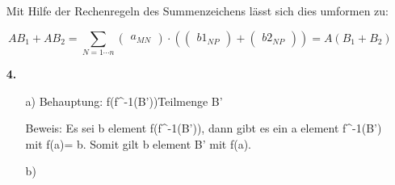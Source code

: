 \documentclass[a4paper,10pt]{scrartcl}
\begin{document}
\begin{enumerate}
        Mit Hilfe der Rechenregeln des Summenzeichens lässt sich dies umformen zu:

        $$
            AB_1 + AB_2 =
            \sum_{N = 1 \cdots n}
            \begin{pmatrix}a_{MN}\end{pmatrix} \cdot \left(
            \begin{pmatrix}b1_{NP}\end{pmatrix} +
            \begin{pmatrix}b2_{NP}\end{pmatrix} \right)
            = A(B_1 + B_2)
        $$

    \item[\textbf{4.}]
        \begin{enumerate}
            \item[a)]
                Behauptung: f(f^-1(B'))Teilmenge B'

        Beweis: Es sei b element f(f^-1(B')), dann gibt es ein a element f^-1(B') mit f(a)= b. Somit gilt b element B' mit f(a).

            \item[b)]

        \end{enumerate}


\end{enumerate}
\end{document}
